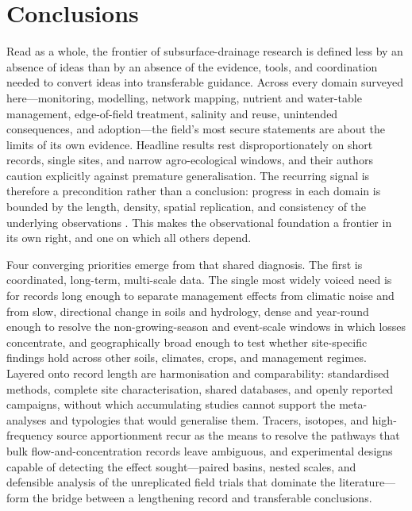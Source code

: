 \documentclass[11pt]{article}
\begin{document}
\section*{Conclusions}

Read as a whole, the frontier of subsurface-drainage research is defined
less by an absence of ideas than by an absence of the evidence, tools, and
coordination needed to convert ideas into transferable guidance. Across
every domain surveyed here---monitoring, modelling, network mapping,
nutrient and water-table management, edge-of-field treatment, salinity and
reuse, unintended consequences, and adoption---the field's most secure
statements are about the limits of its own evidence. Headline results rest
disproportionately on short records, single sites, and narrow
agro-ecological windows, and their authors caution explicitly against
premature generalisation. The recurring signal is therefore a precondition
rather than a conclusion: progress in each domain is bounded by the length,
density, spatial replication, and consistency of the underlying
observations \parencite{Rogger2017,Kladivko2001}. This makes the observational foundation a frontier in its own
right, and one on which all others depend.

Four converging priorities emerge from that shared diagnosis. The first is
coordinated, long-term, multi-scale data. The single most widely voiced need
is for records long enough to separate management effects from climatic
noise and from slow, directional change in soils and hydrology, dense and
year-round enough to resolve the non-growing-season and event-scale windows
in which losses concentrate, and geographically broad enough to test whether
site-specific findings hold across other soils, climates, crops, and
management regimes. Layered onto record length are harmonisation and
comparability: standardised methods, complete site characterisation,
shared databases, and openly reported campaigns, without which accumulating
studies cannot support the meta-analyses and typologies that would
generalise them. Tracers, isotopes, and high-frequency source
apportionment recur as the means to resolve the pathways that bulk
flow-and-concentration records leave ambiguous, and experimental designs
capable of detecting the effect sought---paired basins, nested scales,
and defensible analysis of the unreplicated field trials that dominate the
literature---form the bridge between a lengthening record and transferable
conclusions.
\end{document}
